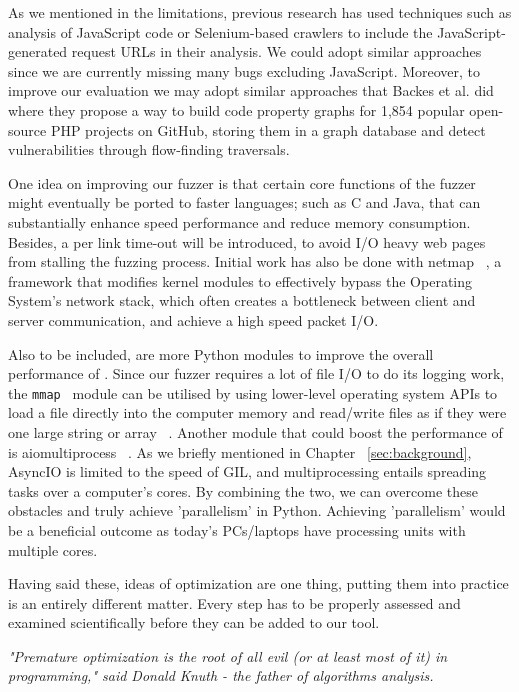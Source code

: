 As we mentioned in the limitations, previous research has used techniques such as analysis of JavaScript code or Selenium-based crawlers to include the JavaScript-generated request URLs in their analysis. We could adopt similar approaches since we are currently missing many bugs excluding JavaScript. Moreover, to improve our evaluation we may adopt similar approaches that Backes et al. did  ~\cite{efficient2017} where they propose a way to build code property graphs for 1,854 popular open-source PHP projects on GitHub, storing them in a graph database and detect vulnerabilities through flow-finding traversals.

One idea on improving our fuzzer is that certain core functions of the
fuzzer might eventually be ported to faster languages; such as C and Java, that can substantially enhance speed performance and reduce memory consumption. Besides, a per link time-out will be introduced, to avoid I/O heavy web pages from stalling the fuzzing process. Initial work has also be done with netmap  ~\cite{rizzo2011Netmap}, a framework that modifies kernel modules to effectively bypass the Operating System's network stack, which often creates a bottleneck between client and server communication, and achieve a high speed packet I/O.

Also to be included, are more Python modules to improve the overall performance of \pname{}. Since our fuzzer requires a lot of file I/O to do its logging work, the {\tt mmap } module can be utilised by using lower-level operating system APIs to load a file directly into the computer memory and read/write files as if they were one large string or array ~\cite{mmap}. Another module that could boost the performance of \pname{} is aiomultiprocess ~\cite{aiomultiprocess}. As we briefly mentioned in Chapter ~\ref{sec:background}, AsyncIO is limited to the speed of GIL, and multiprocessing entails spreading tasks over a computer's cores. By combining the two, we can overcome these obstacles and truly achieve 'parallelism' in Python. Achieving 'parallelism' would be a beneficial outcome as today's PCs/laptops have processing units with multiple cores.

Having said these, ideas of optimization are one thing, putting them into practice is an entirely different matter. Every step has to be properly assessed and examined scientifically before they can be added to our tool.

\textit{"Premature optimization is the root of all evil (or at least most of it) in programming," said Donald Knuth - the father of algorithms analysis.}
